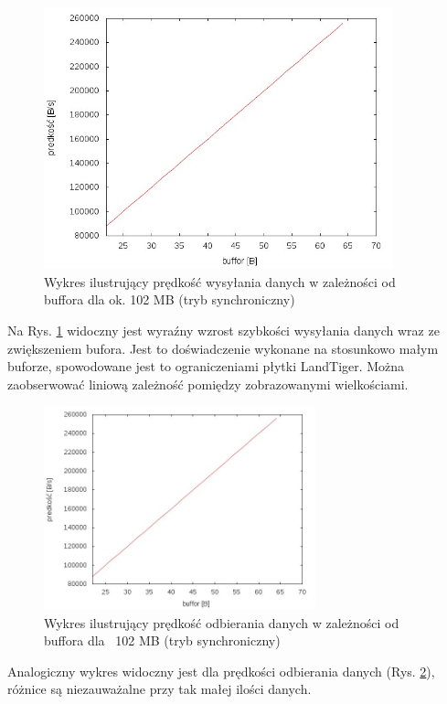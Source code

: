 \documentclass{BscUS}
\begin{document}
\newline
\begin{figure}[H]
{
\centering
\includegraphics[width=0.9\textwidth]{./img/S_107374200Send}
\caption{Wykres ilustrujący prędkość wysyłania danych w zależności od buffora dla ok. 102 MB (tryb synchroniczny)}
\label{fig:S_107374200Send}
}
\end{figure}
\noindent Na Rys. \ref{fig:S_107374200Send} widoczny jest wyraźny wzrost szybkości wysyłania danych wraz ze zwiększeniem bufora. Jest to doświadczenie wykonane na stosunkowo małym buforze, spowodowane jest to ograniczeniami płytki LandTiger. Można zaobserwować liniową zależność pomiędzy zobrazowanymi wielkościami.
\begin{figure}[H]
{
\centering
\includegraphics[width=0.7\textwidth]{./img/S_107374200Receive}
\caption{Wykres ilustrujący prędkość odbierania danych w zależności od buffora dla ~102 MB (tryb synchroniczny)}
\label{fig:S_107374200Receive}
}
\end{figure}
\noindent Analogiczny wykres widoczny jest dla prędkości odbierania danych (Rys. \ref{fig:S_107374200Receive}), różnice są niezauważalne przy tak małej ilości danych.
\end{document}
